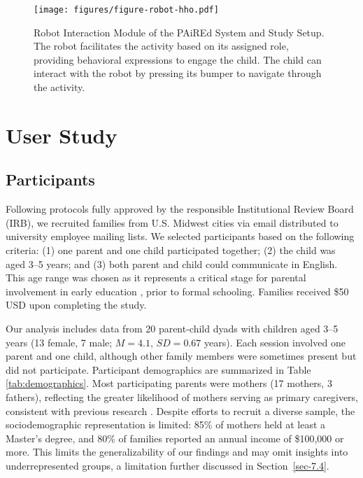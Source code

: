 \begin{table}[t!]
\begin{tabular}{p{0.02\linewidth}p{0.06\linewidth}p{0.09\linewidth}p{0.09\linewidth}p{0.09\linewidth}p{0.13\linewidth}p{0.23\linewidth}}
         \bottomrule
    \end{tabular}
\end{table}

\begin{figure*}[b!]
  \texttt{[image: figures/figure-robot-hho.pdf]}
   \vspace{-6pt}
  \caption{Robot Interaction Module of the PAiREd System and Study Setup. The robot facilitates the activity based on its assigned role, providing behavioral expressions to engage the child. The child can interact with the robot by pressing its bumper to navigate through the activity.}
  \label{fig:robot}
   \vspace{-6pt}
\end{figure*}

\section{User Study} \label{sec-study}

\subsection{Participants} 
Following protocols fully approved by the responsible Institutional Review Board (IRB), we recruited families from U.S. Midwest cities via email distributed to university employee mailing lists. We selected participants based on the following criteria: (1) one parent and one child participated together; (2) the child was aged 3--5 years; and (3) both parent and child could communicate in English. This age range was chosen as it represents a critical stage for parental involvement in early education \cite{purpura2013informal}, prior to formal schooling. Families received \$50 USD upon completing the study.

Our analysis includes data from 20 parent-child dyads with children aged 3–5 years (13 female, 7 male; $M = 4.1$, $SD = 0.67$ years). Each session involved one parent and one child, although other family members were sometimes present but did not participate. Participant demographics are summarized in Table \ref{tab:demographics}.
Most participating parents were mothers (17 mothers, 3 fathers), reflecting the greater likelihood of mothers serving as primary caregivers, consistent with previous research . Despite efforts to recruit a diverse sample, the sociodemographic representation is limited: 85\% of mothers held at least a Master's degree, and 80\% of families reported an annual income of \$100,000 or more. This limits the generalizability of our findings and may omit insights into underrepresented groups, a limitation further discussed in Section~\ref{sec-7.4}.



